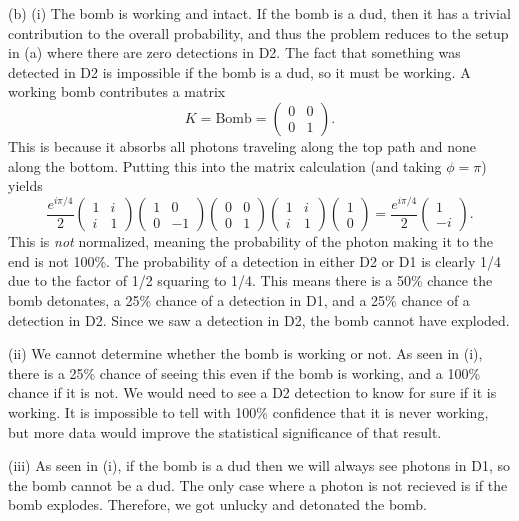 \documentclass[11pt, letterpaper]{article}
\theoremstyle{plain}
\begin{document}
(b) (i) The bomb is working and intact. If the bomb is a dud, then it has a trivial contribution to the overall probability, and thus the problem reduces to the setup in (a) where there are zero detections in D2. The fact that something was detected in D2 is impossible if the bomb is a dud, so it must be working. A working bomb contributes a matrix
\[
	K=\mathrm{Bomb} =\begin{pmatrix}
	0 & 0 \\
	0 & 1
	\end{pmatrix}
.\]
This is because it absorbs all photons traveling along the top path and none along the bottom. Putting this into the matrix calculation (and taking $\phi =\pi $) yields
\[
	\frac{e^{i\pi /4} }{2} \begin{pmatrix}
	1 & i \\
	i & 1
	\end{pmatrix}\begin{pmatrix}
	1 & 0 \\
	0 & -1
	\end{pmatrix}\begin{pmatrix}
	0 & 0 \\
	0 & 1
	\end{pmatrix}\begin{pmatrix}
	1 & i \\
	i & 1
	\end{pmatrix}\begin{pmatrix}
	1 \\
	0
	\end{pmatrix}=\frac{e^{i\pi /4} }{2} \begin{pmatrix}
	1 \\
	-i
	\end{pmatrix}
.\]
This is \emph{not} normalized, meaning the probability of the photon making it to the end is not 100\%. The probability of a detection in either D2 or D1 is clearly 1/4 due to the factor of 1/2 squaring to 1/4. This means there is a 50\% chance the bomb detonates, a 25\% chance of a detection in D1, and a 25\% chance of a detection in D2. Since we saw a detection in D2, the bomb cannot have exploded.

(ii) We cannot determine whether the bomb is working or not. As seen in (i), there is a 25\% chance of seeing this even if the bomb is working, and a 100\% chance if it is not. We would need to see a D2 detection to know for sure if it is working. It is impossible to tell with 100\% confidence that it is never working, but more data would improve the statistical significance of that result.

(iii) As seen in (i), if the bomb is a dud then we will always see photons in D1, so the bomb cannot be a dud. The only case where a photon is not recieved is if the bomb explodes. Therefore, we got unlucky and detonated the bomb.
\end{document}
